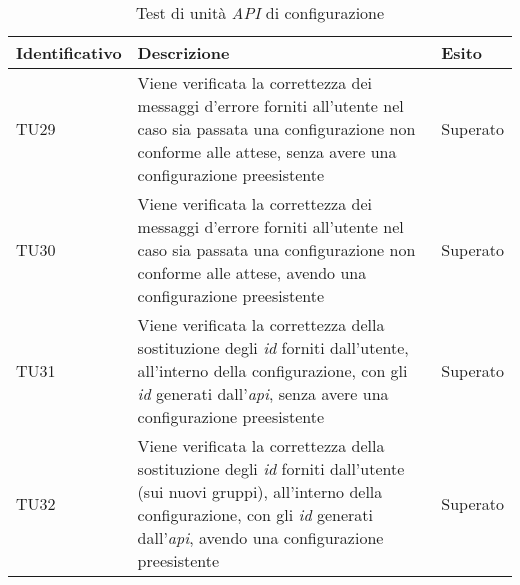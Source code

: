 {
\centering
\begin{longtable}{L{3cm} L{8.5cm} L{2cm}}
\caption{Test di unità \textit{API} di configurazione}\\
\textbf{Identificativo} &
\textbf{Descrizione}&
\textbf{Esito}\\
\endhead
\hline
TU29 & Viene verificata la correttezza dei messaggi d'errore forniti all'utente nel caso sia passata una configurazione non conforme alle attese, senza avere una configurazione preesistente  & Superato\\
\hline
TU30 & Viene verificata la correttezza dei messaggi d'errore forniti all'utente nel caso sia passata una configurazione non conforme alle attese, avendo una configurazione preesistente & Superato\\
\hline
TU31 & Viene verificata la correttezza della sostituzione degli \textit{id} forniti dall'utente, all'interno della configurazione, con gli \textit{id} generati dall'\textit{\gls{api}}, senza avere una configurazione preesistente & Superato\\
\hline
TU32 & Viene verificata la correttezza della sostituzione degli \textit{id} forniti dall'utente (sui nuovi gruppi), all'interno della configurazione, con gli \textit{id} generati dall'\textit{\gls{api}}, avendo una configurazione preesistente & Superato\\
\hline
\end{longtable}
}

